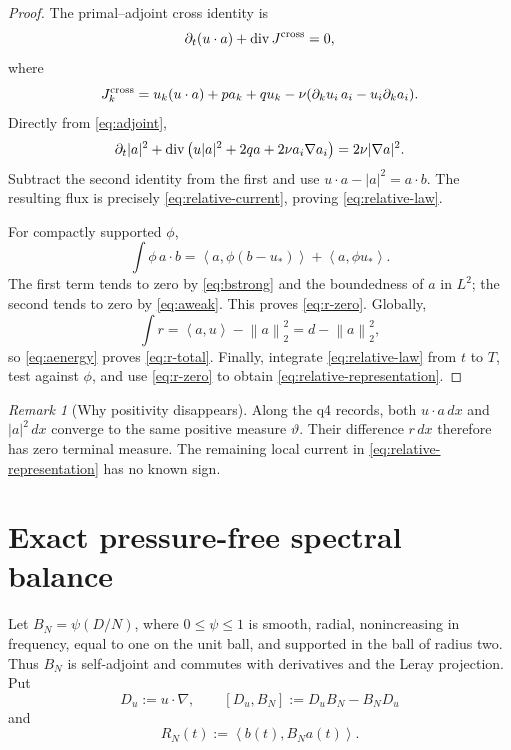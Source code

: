 \documentclass[11pt]{article}
\theoremstyle{remark}
\newtheorem{remark}[theorem]{Remark}
\newcommand{\norm}[1]{\left\|#1\right\|}
\newcommand{\ip}[2]{\left\langle #1,#2\right\rangle}
\newcommand{\diver}{\mathop{\rm div}}
\begin{document}
\begin{proof}
The primal--adjoint cross identity is
\[
 \partial_t(u\cdot a)+\diver J^{\rm cross}=0,
\]
where
\[
 J_k^{\rm cross}
 =
 u_k(u\cdot a)+pa_k+qu_k
 -\nu(\partial_ku_i\,a_i-u_i\partial_ka_i).
\]
Directly from \eqref{eq:adjoint},
\[
 \partial_t|a|^2+
 \diver\left(u|a|^2+2qa+2\nu a_i\nabla a_i\right)
 =2\nu|\nabla a|^2.
\]
Subtract the second identity from the first and use
\(u\cdot a-|a|^2=a\cdot b\).  The resulting flux is precisely
\eqref{eq:relative-current}, proving \eqref{eq:relative-law}.

For compactly supported \(\phi\),
\[
 \int\phi\,a\cdot b
 =
 \ip{a}{\phi(b-u_*)}+\ip{a}{\phi u_*}.
\]
The first term tends to zero by \eqref{eq:bstrong} and the boundedness
of \(a\) in \(L^2\); the second tends to zero by \eqref{eq:aweak}.
This proves \eqref{eq:r-zero}.  Globally,
\[
 \int r=\ip{a}{u}-\norm{a}_2^2
 =d-\norm{a}_2^2,
\]
so \eqref{eq:aenergy} proves \eqref{eq:r-total}.  Finally, integrate
\eqref{eq:relative-law} from \(t\) to \(T\), test against \(\phi\),
and use \eqref{eq:r-zero} to obtain
\eqref{eq:relative-representation}.
\end{proof}

\begin{remark}[Why positivity disappears]
Along the q4 records, both \(u\cdot a\,dx\) and
\(|a|^2\,dx\) converge to the same positive measure
\(\vartheta\).  Their difference \(r\,dx\) therefore has zero terminal
measure.  The remaining local current in
\eqref{eq:relative-representation} has no known sign.
\end{remark}

\section{Exact pressure-free spectral balance}

Let \(B_N=\psi(D/N)\), where \(0\leq\psi\leq1\) is smooth, radial,
nonincreasing in frequency, equal to one on the unit ball, and supported
in the ball of radius two.  Thus \(B_N\) is self-adjoint and commutes with
derivatives and the Leray projection.  Put
\[
 D_u:=u\cdot\nabla,\qquad
 [D_u,B_N]:=D_uB_N-B_ND_u
\]
and
\begin{equation}
\label{eq:RN}
 R_N(t):=\ip{b(t)}{B_Na(t)}.
\end{equation}
\end{document}
